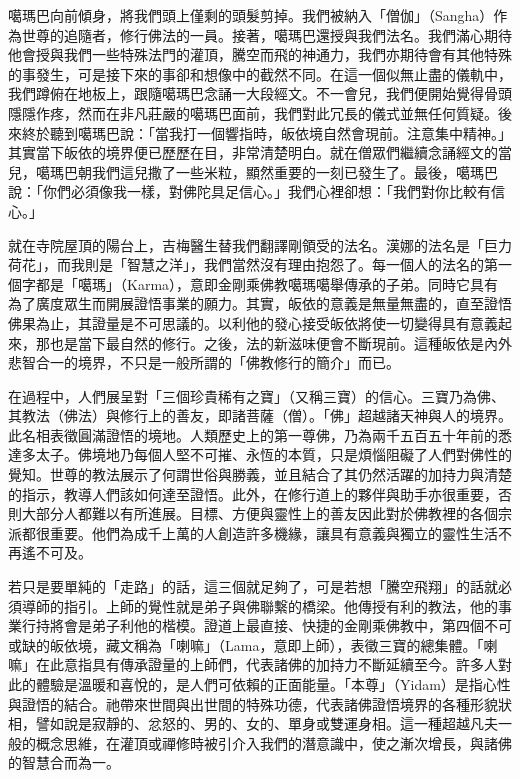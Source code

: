 噶瑪巴向前傾身，將我們頭上僅剩的頭髮剪掉。我們被納入「僧伽」（Sangha）作為世尊的追隨者，修行佛法的一員。接著，噶瑪巴還授與我們法名。我們滿心期待他會授與我們一些特殊法門的灌頂，騰空而飛的神通力，我們亦期待會有其他特殊的事發生，可是接下來的事卻和想像中的截然不同。在這一個似無止盡的儀軌中，我們蹲俯在地板上，跟隨噶瑪巴念誦一大段經文。不一會兒，我們便開始覺得骨頭隱隱作疼，然而在非凡莊嚴的噶瑪巴面前，我們對此冗長的儀式並無任何質疑。後來終於聽到噶瑪巴說：「當我打一個響指時，皈依境自然會現前。注意集中精神。」其實當下皈依的境界便已歷歷在目，非常清楚明白。就在僧眾們繼續念誦經文的當兒，噶瑪巴朝我們這兒撒了一些米粒，顯然重要的一刻已發生了。最後，噶瑪巴說：「你們必須像我一樣，對佛陀具足信心。」我們心裡卻想：「我們對你比較有信心。」

就在寺院屋頂的陽台上，吉梅醫生替我們翻譯剛領受的法名。漢娜的法名是「巨力荷花」，而我則是「智慧之洋」，我們當然沒有理由抱怨了。每一個人的法名的第一個字都是「噶瑪」（Karma），意即金剛乘佛教噶瑪噶舉傳承的子弟。同時它具有為了廣度眾生而開展證悟事業的願力。其實，皈依的意義是無量無盡的，直至證悟佛果為止，其證量是不可思議的。以利他的發心接受皈依將使一切變得具有意義起來，那也是當下最自然的修行。之後，法的新滋味便會不斷現前。這種皈依是內外悲智合一的境界，不只是一般所謂的「佛教修行的簡介」而已。

在過程中，人們展呈對「三個珍貴稀有之寶」（又稱三寶）的信心。三寶乃為佛、其教法（佛法）與修行上的善友，即諸菩薩（僧）。「佛」超越諸天神與人的境界。此名相表徵圓滿證悟的境地。人類歷史上的第一尊佛，乃為兩千五百五十年前的悉達多太子。佛境地乃每個人堅不可摧、永恆的本質，只是煩惱阻礙了人們對佛性的覺知。世尊的教法展示了何謂世俗與勝義，並且結合了其仍然活躍的加持力與清楚的指示，教導人們該如何達至證悟。此外，在修行道上的夥伴與助手亦很重要，否則大部分人都難以有所進展。目標、方便與靈性上的善友因此對於佛教裡的各個宗派都很重要。他們為成千上萬的人創造許多機緣，讓具有意義與獨立的靈性生活不再遙不可及。

若只是要單純的「走路」的話，這三個就足夠了，可是若想「騰空飛翔」的話就必須導師的指引。上師的覺性就是弟子與佛聯繫的橋梁。他傳授有利的教法，他的事業行持將會是弟子利他的楷模。證道上最直接、快捷的金剛乘佛教中，第四個不可或缺的皈依境，藏文稱為「喇嘛」（Lama，意即上師），表徵三寶的總集體。「喇嘛」在此意指具有傳承證量的上師們，代表諸佛的加持力不斷延續至今。許多人對此的體驗是溫暖和喜悅的，是人們可依賴的正面能量。「本尊」（Yidam）是指心性與證悟的結合。祂帶來世間與出世間的特殊功德，代表諸佛證悟境界的各種形貌狀相，譬如說是寂靜的、忿怒的、男的、女的、單身或雙運身相。這一種超越凡夫一般的概念思維，在灌頂或禪修時被引介入我們的潛意識中，使之漸次增長，與諸佛的智慧合而為一。

